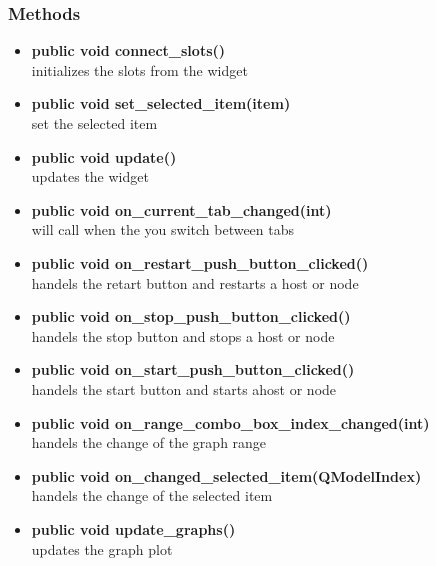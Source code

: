 \subsubsection{Methods}
\begin{itemize}
  \item \textbf{public void connect\_slots()}\\
  initializes the slots from the widget
  \item \textbf{public void set\_selected\_item(item)}\\
  set the selected item
  \item \textbf{public void update()}\\
  updates the widget
  \item \textbf{public void on\_current\_tab\_changed(int)}\\
  will call when the you switch between tabs
  \item \textbf{public void on\_restart\_push\_button\_clicked()}\\
  handels the retart button and restarts a host or node
  \item \textbf{public void on\_stop\_push\_button\_clicked()}\\
  handels the stop button and stops a host or node
  \item \textbf{public void on\_start\_push\_button\_clicked()}\\
  handels the start button and starts ahost or node
  \item \textbf{public void on\_range\_combo\_box\_index\_changed(int)}\\
  handels the change of the graph range
  \item \textbf{public void on\_changed\_selected\_item(QModelIndex)}\\
  handels the change of the selected item
  \item \textbf{public void update\_graphs()}\\
  updates the graph plot
\end{itemize}